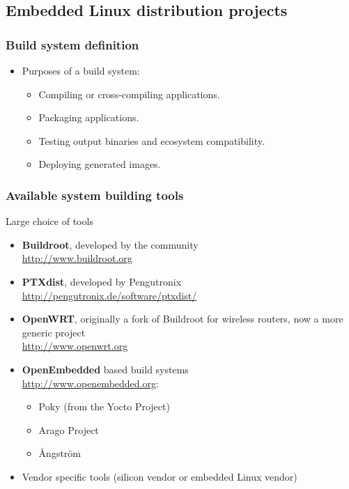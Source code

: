 \subsection{Embedded Linux distribution projects}
\begin{frame}
  \frametitle{Build system definition}
  \begin{itemize}
  \item Purposes of a build system:
    \begin{itemize}
      \item Compiling or cross-compiling applications.
      \item Packaging applications.
      \item Testing output binaries and ecosystem compatibility.
      \item Deploying generated images.
    \end{itemize}
  \end{itemize}
\end{frame}

\begin{frame}
  \frametitle{Available system building tools} Large choice of tools
  \small
  \begin{itemize}
  \item {\bf Buildroot}, developed by the community\\
    \url{http://www.buildroot.org}
  \item {\bf PTXdist}, developed by Pengutronix\\
    \url{http://pengutronix.de/software/ptxdist/}
  \item {\bf OpenWRT}, originally a fork of Buildroot for wireless
    routers, now a more generic project\\
    \url{http://www.openwrt.org}
  \item {\bf OpenEmbedded} based build systems\\
    \url{http://www.openembedded.org}:
        \begin{itemize}
          \item Poky (from the Yocto Project)
          \item Arago Project
          \item Ångström
        \end{itemize}
  \item Vendor specific tools (silicon vendor or embedded Linux
    vendor)
  \end{itemize}
\end{frame}

